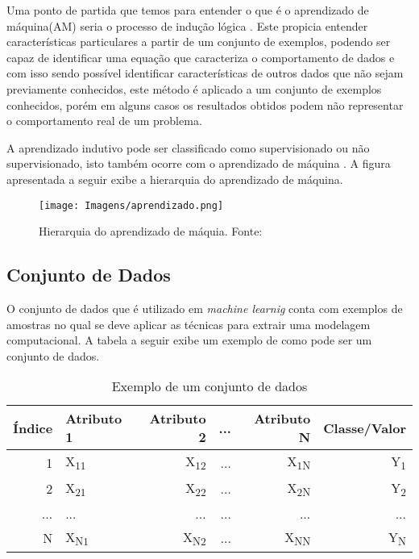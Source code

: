 \documentclass[
12pt,				%
oneside,			%
a4paper,			%
english,			%
french,				%
spanish,			%
brazil				%
]{abntex2}
\begin{document}
Uma ponto de partida que temos para entender o que é o aprendizado de máquina(AM) seria o processo de indução lógica \cite{monard2003conceitos}. Este propicia entender características particulares a partir de um conjunto de exemplos, podendo ser capaz de identificar uma equação que caracteriza o comportamento de dados e com isso sendo possível identificar características de outros dados que não sejam previamente conhecidos, este método é aplicado a um conjunto de exemplos conhecidos, porém em alguns casos os resultados obtidos podem não representar o comportamento real de um problema.

A aprendizado indutivo pode ser classificado como supervisionado ou não supervisionado, isto também ocorre com o aprendizado de máquina \cite{monard2003conceitos}. A figura apresentada a seguir exibe a hierarquia do aprendizado de máquina.

\begin{figure}[H]
	\caption{Hierarquia do aprendizado de máquia. Fonte:\cite{monard2003conceitos}}
	\centering %
	\texttt{[image: Imagens/aprendizado.png]} %
	\label{figura:aprendizado}
	
\end{figure}


\subsection{Conjunto de Dados}

O conjunto de dados que é utilizado em \textit{machine learnig} conta com exemplos de amostras no qual se deve aplicar as técnicas para extrair uma modelagem computacional. A tabela a seguir exibe um exemplo de como pode ser um conjunto de dados. 

\begin{table}[h]
	\centering
	\caption{Exemplo de um conjunto de dados}
	\begin{tabular}{r|lrrrr}
		
		Índice & Atributo 1 & Atributo 2 & ... & Atributo N & Classe/Valor \\ %
		\hline                               %
		1 & X\textsubscript{11}  & X\textsubscript{12} & ... & X\textsubscript{1N} & Y\textsubscript{1} \\
		2 & X\textsubscript{21}  & X\textsubscript{22} & ... & X\textsubscript{2N} & Y\textsubscript{2} \\
		... & ...  & ... & ... & ... & ... \\
		N & X\textsubscript{N1}  & X\textsubscript{N2} & ... & X\textsubscript{NN} & Y\textsubscript{N} \\
		
	\end{tabular}
\label{dataset}
\end{table}
\end{document}
